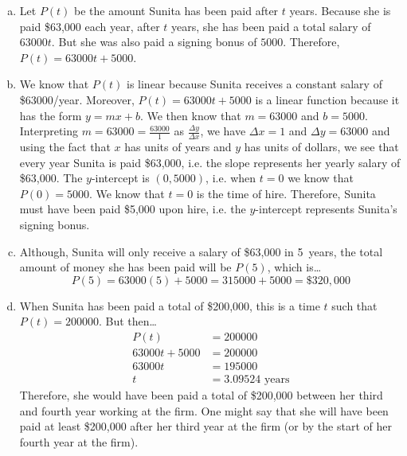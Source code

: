 \documentclass[11pt,letterpaper]{article}
\begin{document}
\sol
\begin{enumerate}[(a)]
\item Let $P(t)$ be the amount Sunita has been paid after $t$ years. Because she is paid \$63,000 each year, after $t$ years, she has been paid a total salary of $63000t$. But she was also paid a signing bonus of $5000$. Therefore, $P(t)= 63000t + 5000$. \pspace

\item We know that $P(t)$ is linear because Sunita receives a constant salary of \$63000/year. Moreover, $P(t)= 63000t + 5000$ is a linear function because it has the form $y= mx + b$. We then know that $m= 63000$ and $b= 5000$. Interpreting $m= 63000= \frac{63000}{1}$ as $\frac{\Delta y}{\Delta x}$, we have $\Delta x= 1$ and $\Delta y= 63000$ and using the fact that $x$ has units of years and $y$ has units of dollars, we see that every year Sunita is paid \$63,000, i.e. the slope represents her yearly salary of \$63,000. The $y$-intercept is $(0, 5000)$, i.e. when $t= 0$ we know that $P(0)= 5000$. We know that $t= 0$ is the time of hire. Therefore, Sunita must have been paid \$5,000 upon hire, i.e. the $y$-intercept represents Sunita's signing bonus. \pspace

\item Although, Sunita will only receive a salary of \$63,000 in 5~years, the total amount of money she has been paid will be $P(5)$, which is\dots
	\[
	P(5)= 63000(5) + 5000= 315000 + 5000= \$320,000
	\] \pspace

\item When Sunita has been paid a total of \$200,000, this is a time $t$ such that $P(t)= 200000$. But then\dots
	\[
	\begin{aligned}
	P(t)&= 200000 \\[0.3cm]
	63000t + 5000&= 200000 \\[0.3cm]
	63000t&= 195000 \\[0.3cm]
	t&= 3.09524 \text{ years}
	\end{aligned}
	\]
Therefore, she would have been paid a total of \$200,000 between her third and fourth year working at the firm. One might say that she will have been paid at least \$200,000 after her third year at the firm (or by the start of her fourth year at the firm). 
\end{enumerate}



\newpage
\end{document}
